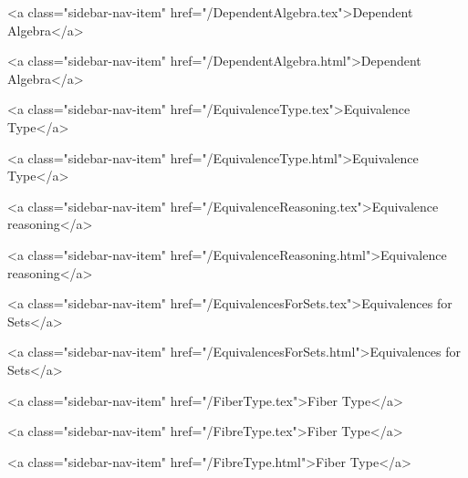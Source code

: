       
        
          <a class="sidebar-nav-item" href="/DependentAlgebra.tex">Dependent Algebra</a>
        
      
    
      
        
          <a class="sidebar-nav-item" href="/DependentAlgebra.html">Dependent Algebra</a>
        
      
    
      
        
          <a class="sidebar-nav-item" href="/EquivalenceType.tex">Equivalence Type</a>
        
      
    
      
        
          <a class="sidebar-nav-item" href="/EquivalenceType.html">Equivalence Type</a>
        
      
    
      
        
          <a class="sidebar-nav-item" href="/EquivalenceReasoning.tex">Equivalence reasoning</a>
        
      
    
      
        
          <a class="sidebar-nav-item" href="/EquivalenceReasoning.html">Equivalence reasoning</a>
        
      
    
      
        
          <a class="sidebar-nav-item" href="/EquivalencesForSets.tex">Equivalences for Sets</a>
        
      
    
      
        
          <a class="sidebar-nav-item" href="/EquivalencesForSets.html">Equivalences for Sets</a>
        
      
    
      
        
          <a class="sidebar-nav-item" href="/FiberType.tex">Fiber Type</a>
        
      
    
      
        
          <a class="sidebar-nav-item" href="/FibreType.tex">Fiber Type</a>
        
      
    
      
        
          <a class="sidebar-nav-item" href="/FibreType.html">Fiber Type</a>
        
